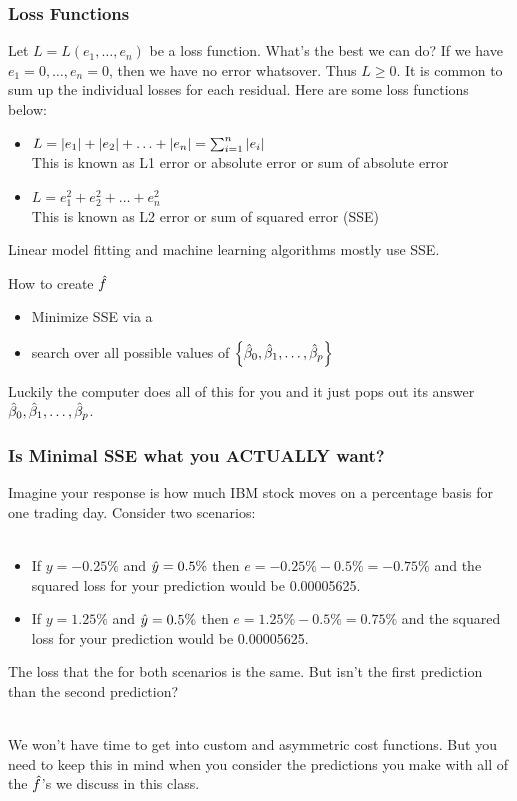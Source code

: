 \documentclass[handout]{beamer}
\begin{document}
\begin{frame}\frametitle{Loss Functions}

\small
Let $L = L(e_1, \ldots, e_n)$ be a loss function. What's the best we can do?  \pause If we have $e_1 = 0, \ldots, e_n = 0$, then we have no error whatsover. Thus $L \geq 0$. \pause  It is common to sum up the individual losses for each residual. Here are some loss functions below:

\begin{itemize}
\item $L = \left|e_1\right| + \left|e_2\right| + \ldots + \left|e_n\right| = \sum_{i=1}^n \left|e_i\right|$ \\ \pause 
This is known as L1 error or absolute error or sum of absolute error \pause 
\item $L = e_1^2 + e_2^2 + \ldots + e_n^2$  \\ \pause 
This is known as L2 error or sum of squared error (SSE) \pause 
\end{itemize}

Linear model fitting and machine learning algorithms mostly use SSE.

\begin{block}{How to create $\hat{f}$} \pause 
\begin{itemize}
\item Minimize SSE via a  \pause 
\item search over all possible values of $\left\{\hat{\beta}_0, \hat{\beta}_1,  \ldots, \hat{\beta}_p\right\}$
\end{itemize}
\end{block}
 \pause 
Luckily the computer does all of this for you and it just pops out its answer $\hat{\beta}_0, \hat{\beta}_1,  \ldots, \hat{\beta}_p$.
	
\end{frame}

\begin{frame}\frametitle{Is Minimal SSE what you ACTUALLY want?}

Imagine your response is how much IBM stock moves on a percentage basis for one trading day. Consider two scenarios:\\~\\ \pause 

\begin{itemize}
\item If $y = -0.25\%$ and $\hat{y} = 0.5\%$ then $e = -0.25\% - 0.5\% = -0.75\%$ and the squared loss for your prediction would be 0.00005625.  \pause 
\item If $y = 1.25\%$ and $\hat{y} = 0.5\%$ then $e = 1.25\% - 0.5\% = 0.75\%$ and the squared loss for your prediction would be 0.00005625. 
\end{itemize}
	
The loss that the  for both scenarios is the same. But isn't the first prediction  than the second prediction? \\~\\ \pause 

We won't have time to get into custom and asymmetric cost functions. But you need to keep this in mind when you consider the predictions you make with all of the $\hat{f}$'s we discuss in this class.
\end{frame}
\end{document}
